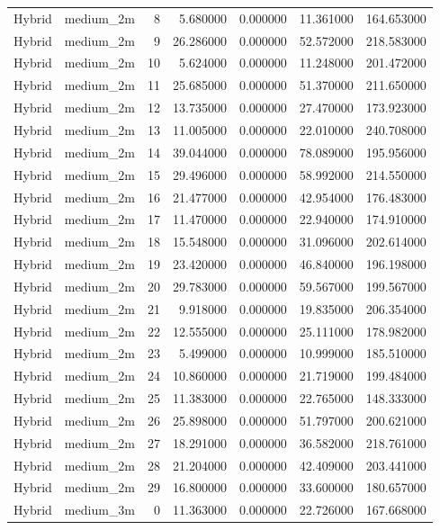 \begin{tabular}{llrrrrr}
Hybrid & medium_2m & 8 & 5.680000 & 0.000000 & 11.361000 & 164.653000 \\
Hybrid & medium_2m & 9 & 26.286000 & 0.000000 & 52.572000 & 218.583000 \\
Hybrid & medium_2m & 10 & 5.624000 & 0.000000 & 11.248000 & 201.472000 \\
Hybrid & medium_2m & 11 & 25.685000 & 0.000000 & 51.370000 & 211.650000 \\
Hybrid & medium_2m & 12 & 13.735000 & 0.000000 & 27.470000 & 173.923000 \\
Hybrid & medium_2m & 13 & 11.005000 & 0.000000 & 22.010000 & 240.708000 \\
Hybrid & medium_2m & 14 & 39.044000 & 0.000000 & 78.089000 & 195.956000 \\
Hybrid & medium_2m & 15 & 29.496000 & 0.000000 & 58.992000 & 214.550000 \\
Hybrid & medium_2m & 16 & 21.477000 & 0.000000 & 42.954000 & 176.483000 \\
Hybrid & medium_2m & 17 & 11.470000 & 0.000000 & 22.940000 & 174.910000 \\
Hybrid & medium_2m & 18 & 15.548000 & 0.000000 & 31.096000 & 202.614000 \\
Hybrid & medium_2m & 19 & 23.420000 & 0.000000 & 46.840000 & 196.198000 \\
Hybrid & medium_2m & 20 & 29.783000 & 0.000000 & 59.567000 & 199.567000 \\
Hybrid & medium_2m & 21 & 9.918000 & 0.000000 & 19.835000 & 206.354000 \\
Hybrid & medium_2m & 22 & 12.555000 & 0.000000 & 25.111000 & 178.982000 \\
Hybrid & medium_2m & 23 & 5.499000 & 0.000000 & 10.999000 & 185.510000 \\
Hybrid & medium_2m & 24 & 10.860000 & 0.000000 & 21.719000 & 199.484000 \\
Hybrid & medium_2m & 25 & 11.383000 & 0.000000 & 22.765000 & 148.333000 \\
Hybrid & medium_2m & 26 & 25.898000 & 0.000000 & 51.797000 & 200.621000 \\
Hybrid & medium_2m & 27 & 18.291000 & 0.000000 & 36.582000 & 218.761000 \\
Hybrid & medium_2m & 28 & 21.204000 & 0.000000 & 42.409000 & 203.441000 \\
Hybrid & medium_2m & 29 & 16.800000 & 0.000000 & 33.600000 & 180.657000 \\
Hybrid & medium_3m & 0 & 11.363000 & 0.000000 & 22.726000 & 167.668000 \\

\end{tabular}
